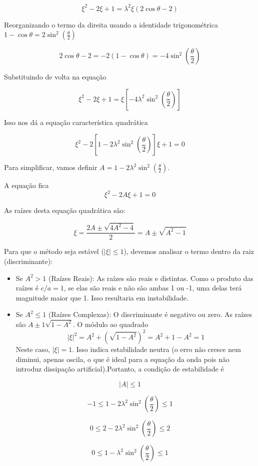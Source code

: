 \documentclass[11pt]{article}
\begin{document}
\[\xi^2 - 2\xi + 1 = \lambda^2 \xi (2\cos\theta - 2)\]

Reorganizando o termo da direita usando a identidade trigonométrica
\(1 - \cos\theta = 2\sin^2\left(\frac{\theta}{2}\right)\)

\[2\cos\theta - 2 = -2(1 - \cos\theta) = -4\sin^2\left(\frac{\theta}{2}\right)\]

Substituindo de volta na equação

\[\xi^2 - 2\xi + 1 = \xi \left[ -4\lambda^2 \sin^2\left(\frac{\theta}{2}\right) \right]\]

Isso nos dá a equação característica quadrática

\[\xi^2 - 2\left[ 1 - 2\lambda^2 \sin^2\left(\frac{\theta}{2}\right) \right] \xi + 1 = 0\]

Para simplificar, vamos definir
\(A = 1 - 2\lambda^2 \sin^2(\frac{\theta}{2})\).

A equação fica \[\xi^2 - 2A\xi + 1 = 0\]

As raízes desta equação quadrática são:

\[\xi = \frac{2A \pm \sqrt{4A^2 - 4}}{2} = A \pm \sqrt{A^2 - 1}\]

    Para que o método seja estável (\(|\xi| \le 1\)), devemos analisar o
termo dentro da raiz (discriminante):

\begin{itemize}
\item
  Se \(A^2 > 1\) (Raízes Reais): As raízes são reais e distintas. Como o
  produto das raízes é \(c/a = 1\), se elas são reais e não são ambas 1
  ou -1, uma delas terá magnitude maior que 1. Isso resultaria em
  instabilidade.
\item
  Se \(A^2 \le 1\) (Raízes Complexas): O discriminante é negativo ou
  zero. As raízes são \(A \pm \mathcal{1}\sqrt{1-A^2}\). O módulo ao
  quadrado \[|\xi|^2 = A^2 + (\sqrt{1-A^2})^2 = A^2 + 1 - A^2 = 1\]Neste
  caso, \(|\xi| = 1\). Isso indica estabilidade neutra (o erro não
  cresce nem diminui, apenas oscila, o que é ideal para a equação da
  onda pois não introduz dissipação artificial).Portanto, a condição de
  estabilidade é
\end{itemize}

\[|A| \le 1\]

\[-1 \le 1 - 2\lambda^2 \sin^2\left(\frac{\theta}{2}\right) \le 1\]

\[0 \le 2 - 2\lambda^2 \sin^2\left(\frac{\theta}{2}\right) \le 2\]

\[0 \le 1 - \lambda^2 \sin^2\left(\frac{\theta}{2}\right) \le 1\]
\end{document}
